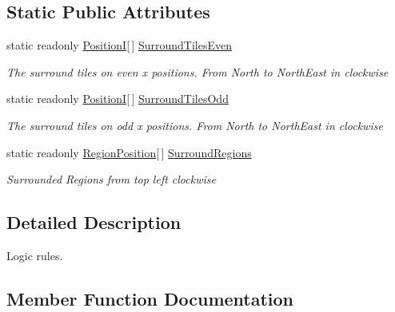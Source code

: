 \subsection*{Static Public Attributes}
\begin{DoxyCompactItemize}
\item 
static readonly \hyperlink{classCore_1_1Models_1_1PositionI}{Position\+I}\mbox{[}$\,$\mbox{]} \hyperlink{classCore_1_1Models_1_1LogicRules_a3d587d8f781d3b37c26c501d003f3d4d}{Surround\+Tiles\+Even}
\begin{DoxyCompactList}\small\item\em The surround tiles on even x positions. From North to North\+East in clockwise \end{DoxyCompactList}\item 
static readonly \hyperlink{classCore_1_1Models_1_1PositionI}{Position\+I}\mbox{[}$\,$\mbox{]} \hyperlink{classCore_1_1Models_1_1LogicRules_ae559d0e04d49b4cea7874d1e7ca5a5b2}{Surround\+Tiles\+Odd}
\begin{DoxyCompactList}\small\item\em The surround tiles on odd x positions. From North to North\+East in clockwise \end{DoxyCompactList}\item 
static readonly \hyperlink{classCore_1_1Models_1_1RegionPosition}{Region\+Position}\mbox{[}$\,$\mbox{]} \hyperlink{classCore_1_1Models_1_1LogicRules_a42380b97e68c7128580776742ef94e56}{Surround\+Regions}
\begin{DoxyCompactList}\small\item\em Surrounded Regions from top left clockwise \end{DoxyCompactList}\end{DoxyCompactItemize}


\subsection{Detailed Description}
Logic rules. 



\subsection{Member Function Documentation}
\hypertarget{classCore_1_1Models_1_1LogicRules_a6f32bcf0c8d5d0de815beb46dd8e5051}{}

